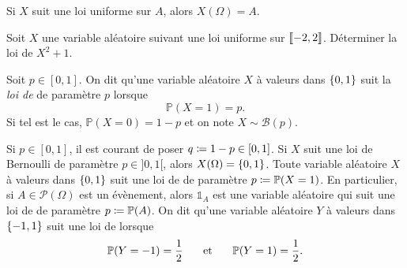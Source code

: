\documentclass{magnolia}
\begin{document}
\begin{remarqueUnique}
\remarque Si $X$ suit une loi uniforme sur $A$, alors $X(\Omega)=A$.
\end{remarqueUnique}
\begin{exoUnique}
\exo Soit $X$ une variable aléatoire suivant une loi uniforme sur $\left\llbracket -2,2\right\rrbracket$. Déterminer la loi
  de $X^2+1$.
\end{exoUnique}


\begin{definition}[nom={Loi de \nom{Bernoulli}}]
Soit $p\in[0,1]$. On dit qu'une variable aléatoire $X$ à valeurs dans $\left\{0,1\right\}$ suit la \emph{loi de
} de paramètre $p$ lorsque
\[\mathbb{P}(X=1)=p.\]
Si tel est le cas, $\mathbb{P}(X=0)=1-p$ et on note $X\sim\mathcal{B}(p)$.
\end{definition}

\begin{remarques}
\remarque Si $p\in[0,1]$, il est courant de poser $q\coloneqq 1-p\in[0,1]$.
\remarque Si $X$ suit une loi de Bernoulli de paramètre $p\in]0,1[$, alors $X(\Omega)=\left\{0,1\right\}$.
\remarque Toute variable aléatoire $X$ à valeurs dans $\left\{0,1\right\}$ suit une loi de 
  de paramètre $p\coloneqq\mathbb{P}(X=1)$. En particulier, si $A\in\mathcal{P}(\Omega)$ est un évènement,
  alors $\mathds{1}_A$ est une variable aléatoire qui suit une
  loi de  de paramètre $p\coloneqq\mathbb{P}(A)$.
\remarque On dit qu'une variable aléatoire $Y$ à valeurs dans $\left\{-1,1\right\}$ suit une loi de
   lorsque
  \[\mathbb{P}(Y=-1)=\frac{1}{2} \quad\quad\!\text{et}\quad\!\quad \mathbb{P}(Y=1)=\frac{1}{2}.\]
\end{remarques}
\end{document}
